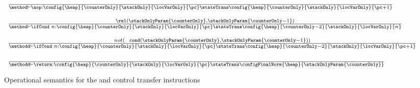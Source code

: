 \begin{figure}[ht!] 
\begin{frameit}
 $$ \begin{array}{l}
           {\scriptsize \frac{ } 			       		               
                      {\method \vdash \nop : \config{\heap }{\counterOnly}{\stackOnly}{\locVarOnly}{\pc}
		                      \stateTrans 
				      \config{\heap}{\counterOnly}{\stackOnly}{\locVarOnly}{\pc+1}} 
            } \\    \\
           {\scriptsize \frac{ \rel ( \stackOnlyParam{\counterOnly}, \stackOnlyParam{\counterOnly - 1}) } 			       		               
                      {\method \vdash \ifCond \ n : \config{\heap }{\counterOnly}{\stackOnly}{\locVarOnly}{\pc}
		                      \stateTrans 
				      \config{\heap}{\counterOnly - 2}{\stackOnly}{\locVarOnly}{n}} 
            } \\    \\
		 {\scriptsize
                 \frac{  not (\mbox{ \rm \texttt{ cond}}( \stackOnlyParam{\counterOnly}, \stackOnlyParam{\counterOnly - 1})) }		                             
                     {\methodd \vdash \ifCond \ n : \config{\heap}{\counterOnly}{\stackOnly}{\locVarOnly}{\pc} 
		                    \stateTrans 
                                    \config{\heap}{\counterOnly - 2}{\stackOnly}{\locVarOnly}{\pc + 1}} } \\ \\
           {\scriptsize \frac{ } 
            {\methodd \vdash \return :\config{\heap}{\counterOnly}{\stackOnly}{\locVarOnly}{\pc} 
		                    \stateTrans 
                                    \configFinalNorm{\heap}{\stackOnlyParam{\counterOnly}}}   }
\end{array}
$$

\caption{\sc Operational semantics for the \nop{} and control transfer instructions}
\label{opSem:jump}
\end{frameit}
\end{figure}



